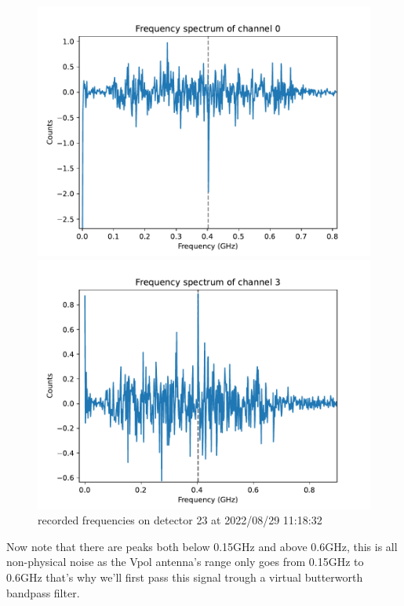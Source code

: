 \documentclass[11pt,a4paper,faculty=we,language=en,doctype=report]{cls/ugent-doc}
\begin{document}
\begin{figure}
	\begin{minipage}{0.49\textwidth}
		\includegraphics[width=\textwidth]{figures/23-800-0-freq.pdf}
	\end{minipage}
	\begin{minipage}{0.49\textwidth}
		\includegraphics[width=\textwidth]{figures/23-800-3-freq.pdf}
	\end{minipage}
	\caption{recorded frequencies on detector 23 at 2022/08/29 11:18:32}
	\label{fig:freqs03}
\end{figure}
Now note that there are peaks both below 0.15GHz and above 0.6GHz,
this is all non-physical noise as the Vpol antenna's range only goes from
0.15GHz to 0.6GHz \cite{Aguilar_2021} that's why we'll first pass this signal
trough a virtual butterworth bandpass filter.
\end{document}
